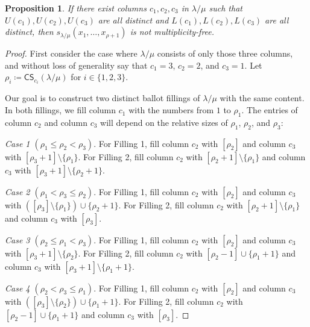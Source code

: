 \documentclass[10pt]{article}
\newtheorem{prop}[theorem]{Proposition}
\theoremstyle{definition}
\newcommand{\CS	}{\mathsf{CS}}
\let\hypertargeta\hypertarget %
\newenvironment{Case}[1]{\par\vskip2pt\noindent%
\emph{#1}.}{\vskip2pt}
\begin{document}
\begin{prop}
\label{prop:3col}
If there exist columns $c_1,c_2,c_3$ in $\lambda/\mu$ such that $U(c_1),U(c_2),U(c_3)$ are all distinct and $L(c_1),L(c_2),L(c_3)$ are all distinct, then $s_{\lambda/\mu}(x_1,\ldots,x_{\rho+1})$ is not multiplicity-free.
\end{prop}
\begin{proof}


First consider the case where $\lambda/\mu$ consists of only those three columns, and without loss of generality say that $c_1=3$, $c_2=2$, and $c_3=1$. Let $\rho_i \coloneqq \CS _{c_i}(\lambda/\mu)$ for $i \in \{1,2,3\}$.

Our goal is to construct two distinct ballot fillings of $\lambda/\mu$ with the same content. In both fillings, we fill column $c_1$ with the numbers from $1$ to $\rho_1$. The entries of column $c_2$ and column $c_3$ will depend on the relative sizes of $\rho_1$, $\rho_2$, and $\rho_3$:


\begin{Case}
{\hypertargeta{prop3.5case_1}{Case 1} $(\rho_1\leq \rho_2 < \rho_3)$} 
For Filling 1, fill column $c_2$ with $[\rho_2]$ and column $c_3$ with $[\rho_3+1]\setminus \{\rho_1\}$. For Filling 2, fill column $c_2$ with $[\rho_2+1]\setminus \{\rho_1\}$ and column $c_3$ with $[\rho_3+1]\setminus \{\rho_2+1\}$.
\end{Case}

\begin{Case}
{\hypertargeta{prop3.5case_2}{Case 2} $(\rho_1< \rho_3 \leq \rho_2)$} 
For Filling 1, fill column $c_2$ with $[\rho_2]$ and column $c_3$ with $([\rho_3]\setminus \{\rho_1\})\cup \{\rho_2+1\}$. For Filling 2, fill column $c_2$ with $[\rho_2+1]\setminus \{\rho_1\}$ and column $c_3$ with $[ \rho_3]$.
\end{Case}

\begin{Case}
{\hypertargeta{prop3.5case_3}{Case 3} $(\rho_2\leq \rho_1 < \rho_3)$} 
For Filling 1, fill column $c_2$ with $[\rho_2]$ and column $c_3$ with $[\rho_3+1]\setminus \{\rho_2\}$. For Filling 2, fill column $c_2$ with $[\rho_2-1]\cup\{\rho_1+1\}$ and column $c_3$ with $[\rho_3+1]\setminus\{\rho_1+1\}$.
\end{Case}

\begin{Case}
{\hypertargeta{prop3.5case_4}{Case 4} $(\rho_2< \rho_3 \leq \rho_1)$} For Filling 1, fill column $c_2$ with $[\rho_2]$ and column $c_3$ with $([\rho_3]\setminus \{\rho_2\})\cup \{\rho_1+1\}$. For Filling 2, fill column $c_2$ with $[\rho_2-1]\cup\{\rho_1+1\}$ and column $c_3$ with $[\rho_3]$.
\end{Case}


\end{proof}
\end{document}
